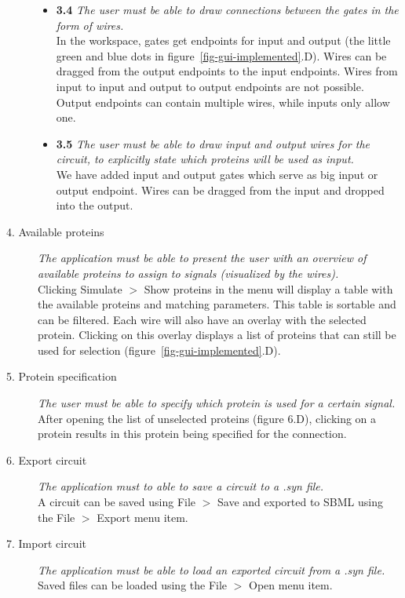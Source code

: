 \documentclass[a4paper]{article}
\begin{document}
\begin{description}
\begin{itemize}
	\item \textbf{3.4} \textit{The user must be able to draw connections between the gates in the form of wires.}\\
	In the workspace, gates get endpoints for input and output (the little green and blue dots in figure~\ref{fig-gui-implemented}.D). Wires can be dragged from the output endpoints to the input endpoints. Wires from input to input and output to output endpoints are not possible. Output endpoints can contain multiple wires, while inputs only allow one.

	\item \textbf{3.5} \textit{The user must be able to draw input and output wires for the circuit, to explicitly state which proteins will be used as input.}\\
	We have added input and output gates which serve as big input or output endpoint. Wires can be dragged from the input and dropped into the output.

	\end{itemize}
\item[4. Available proteins] \textit{The application must be able to present the user with an overview of available proteins to assign to signals (visualized by the wires).}\\
Clicking Simulate $>$ Show proteins in the menu will display a table with the available proteins and matching parameters. This table is sortable and can be filtered. Each wire will also have an overlay with the selected protein. Clicking on this overlay displays a list of proteins that can still be used for selection (figure~\ref{fig-gui-implemented}.D).

\item[5. Protein specification] \textit{The user must be able to specify which protein is used for a certain signal.}\\
After opening the list of unselected proteins (figure 6.D), clicking on a protein results in this protein being specified for the connection.

\item[6. Export circuit] \textit{The application must to able to save a circuit to a .syn file.}\\
A circuit can be saved using File $>$ Save and exported to SBML using the File $>$ Export menu item.

\item[7. Import circuit] \textit{The application must be able to load an exported circuit from a .syn file.}\\
Saved files can be loaded using the File $>$ Open menu item.


\end{description}
\end{document}

